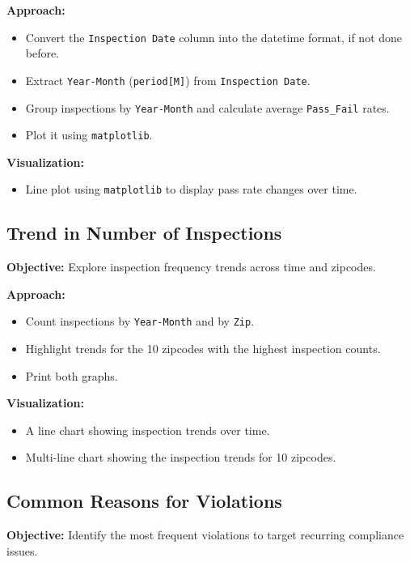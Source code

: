\documentclass[12pt]{article}
\begin{document}
\textbf{Approach:}
\begin{itemize}
    \item Convert the \texttt{Inspection Date} column into the datetime format, if not done before.
    \item Extract \texttt{Year-Month} (\texttt{period[M]}) from \texttt{Inspection Date}.
    \item Group inspections by \texttt{Year-Month} and calculate average \texttt{Pass\_Fail} rates.
    \item Plot it using \texttt{matplotlib}.
\end{itemize}

\textbf{Visualization:}
\begin{itemize}
    \item Line plot using \texttt{matplotlib} to display pass rate changes over time.
\end{itemize}

\subsection*{Trend in Number of Inspections}
\textbf{Objective:} Explore inspection frequency trends across time and zipcodes.

\textbf{Approach:}
\begin{itemize}
    \item Count inspections by \texttt{Year-Month} and by \texttt{Zip}.
    \item Highlight trends for the 10 zipcodes with the highest inspection counts.
    \item Print both graphs.
\end{itemize}

\textbf{Visualization:}
\begin{itemize}
    \item A line chart showing inspection trends over time.
    \item Multi-line chart showing the inspection trends for 10 zipcodes.
\end{itemize}

\subsection*{Common Reasons for Violations}
\textbf{Objective:} Identify the most frequent violations to target recurring compliance issues.
\end{document}
